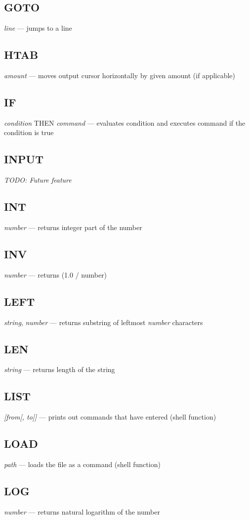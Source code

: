 \subsection{GOTO} \emph{line} --- jumps to a line
\subsection{HTAB} \emph{amount} --- moves output cursor horizontally by given amount (if applicable)
\subsection{IF} \emph{condition} THEN \emph{command} --- evaluates condition and executes command if the condition is true
\subsection{INPUT} \emph{TODO: Future feature}
\subsection{INT} \emph{number} --- returns integer part of the number
\subsection{INV} \emph{number} --- returns (1.0 / number)
\subsection{LEFT} \emph{string}, \emph{number} --- returns substring of leftmost \emph{number} characters
\subsection{LEN} \emph{string} --- returns length of the string
\subsection{LIST} \emph{[from[, to]]} --- prints out commands that have entered (shell function)
\subsection{LOAD} \emph{path} --- loads the file as a command (shell function)
\subsection{LOG} \emph{number} --- returns natural logarithm of the number
